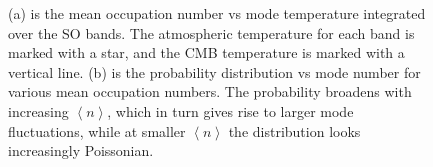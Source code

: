 \begin{figure}[!t]
    \centering
    \caption{(a) is the mean occupation number vs mode temperature integrated over the SO bands. The atmospheric temperature for each band is marked with a star, and the CMB temperature is marked with a vertical line. (b) is the probability distribution vs mode number for various mean occupation numbers. The probability broadens with increasing $\left< n \right>$, which in turn gives rise to larger mode fluctuations, while at smaller $\left< n \right>$ the distribution looks increasingly Poissonian.}
    \label{fig:my_label}
\end{figure}

